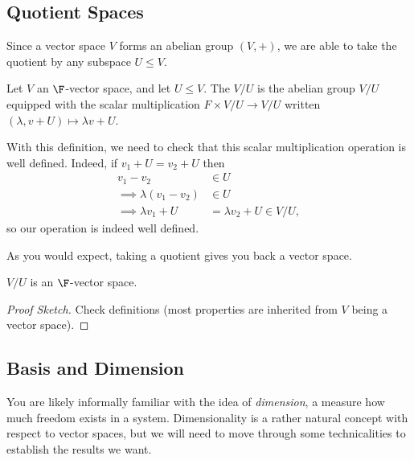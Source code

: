 \subsection{Quotient Spaces}

Since a vector space $V$ forms an abelian group $(V, +)$, we are able to take the quotient by any subspace $U \leq V$. 

\begin{definition}
    Let $V$ an $\F$-vector space, and let $U \leq V$. The  $V/U$ is the abelian group $V/U$ equipped with the scalar multiplication $F \times V/U \rightarrow V/U$ written $(\lambda, v + U) \mapsto \lambda v + U$.
\end{definition}

With this definition, we need to check that this scalar multiplication operation 
is well defined. Indeed, if $v_1 + U = v_2 + U$ then
\begin{align*}
    v_1 - v_2 &\in U \\
\implies \lambda(v_1 - v_2) &\in U \\
\implies \lambda v_1 + U &= \lambda v_2 + U \in V/U,
\end{align*}
so our operation is indeed well defined.

As you would expect, taking a quotient gives you back a vector space.

\begin{proposition}
    $V/U$ is an $\F$-vector space.
\end{proposition}
\begin{proof}[Proof Sketch]
    Check definitions (most properties are inherited from $V$ being a vector space).
\end{proof}


\subsection{Basis and Dimension}

You are likely informally familiar with the idea of \emph{dimension}, a measure how much freedom exists in a system. Dimensionality is a rather natural concept with respect to vector spaces, but we will need to move through some technicalities to establish the results we want.

